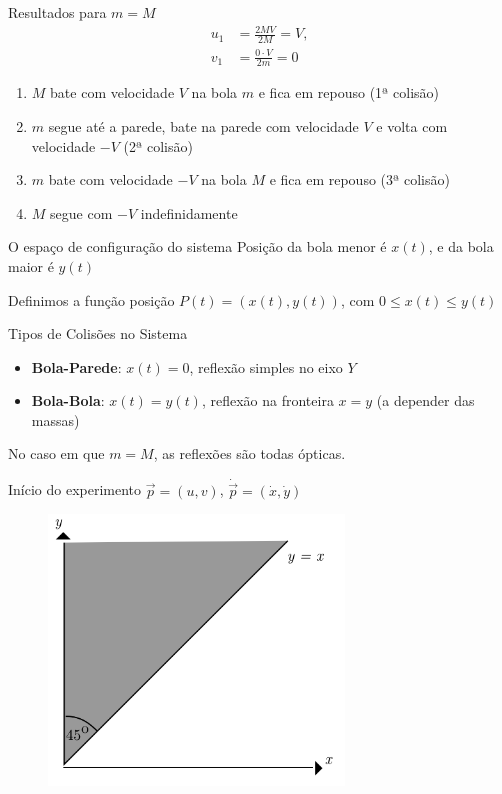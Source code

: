 \documentclass{beamer}
\begin{document}
\begin{frame}{Resultados para $m = M$}
  \begin{equation*}
    \begin{aligned}
      u_1 &= \frac{2MV}{2M} = V, \\
      v_1 &= \frac{0 \cdot V}{2m} = 0
    \end{aligned}
  \end{equation*}
  \begin{enumerate}
    \item $M$ bate com velocidade $V$ na bola $m$ e fica em repouso (1ª colisão)
    \item $m$ segue até a parede, bate na parede com velocidade $V$ e volta com velocidade $-V$ (2ª colisão)
    \item $m$ bate com velocidade $-V$ na bola $M$ e fica em repouso (3ª colisão)
    \item $M$ segue com $-V$ indefinidamente
  \end{enumerate}
\end{frame}

\begin{frame}{O espaço de configuração do sistema}
  Posição da bola menor é $x(t)$, e da bola maior é $y(t)$
  
  Definimos a função posição $P(t) = (x(t), y(t))$, com $0 \le x(t) \le y(t)$
\end{frame}

\begin{frame}{Tipos de Colisões no Sistema}
  \begin{itemize}
    \item \textbf{Bola-Parede}: $x(t)=0$, reflexão simples no eixo $Y$
    \item \textbf{Bola-Bola}: $x(t)=y(t)$, reflexão na fronteira $x=y$ (a depender das massas)
  \end{itemize}
  No caso em que $m=M$, as reflexões são todas ópticas.
\end{frame}

\begin{frame}{Início do experimento}
  $\vec{p}=(u,v)$, $\dot{\vec{p}}=(\dot x,\dot y)$
  \begin{figure}
    \centering
    \includegraphics[width=0.7\textwidth]{images/image1-1.png}
  \end{figure}
\end{frame}
\end{document}
